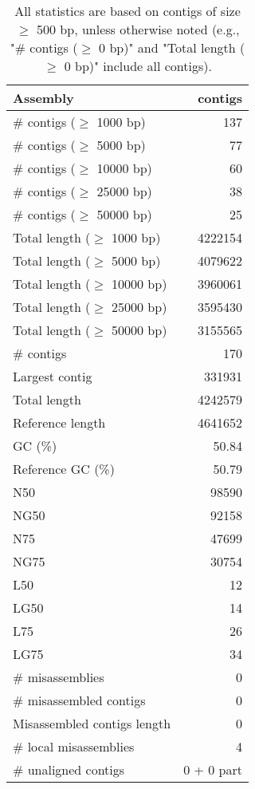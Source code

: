 \documentclass[12pt,a4paper]{article}
\begin{document}
\begin{table}[ht]
\begin{center}
\caption{All statistics are based on contigs of size $\geq$ 500 bp, unless otherwise noted (e.g., "\# contigs ($\geq$ 0 bp)" and "Total length ($\geq$ 0 bp)" include all contigs).}
\begin{tabular}{|l*{1}{|r}|}
\hline
Assembly & contigs \\ \hline
\# contigs ($\geq$ 1000 bp) & 137 \\ \hline
\# contigs ($\geq$ 5000 bp) & 77 \\ \hline
\# contigs ($\geq$ 10000 bp) & 60 \\ \hline
\# contigs ($\geq$ 25000 bp) & 38 \\ \hline
\# contigs ($\geq$ 50000 bp) & 25 \\ \hline
Total length ($\geq$ 1000 bp) & 4222154 \\ \hline
Total length ($\geq$ 5000 bp) & 4079622 \\ \hline
Total length ($\geq$ 10000 bp) & 3960061 \\ \hline
Total length ($\geq$ 25000 bp) & 3595430 \\ \hline
Total length ($\geq$ 50000 bp) & 3155565 \\ \hline
\# contigs & 170 \\ \hline
Largest contig & 331931 \\ \hline
Total length & 4242579 \\ \hline
Reference length & 4641652 \\ \hline
GC (\%) & 50.84 \\ \hline
Reference GC (\%) & 50.79 \\ \hline
N50 & 98590 \\ \hline
NG50 & 92158 \\ \hline
N75 & 47699 \\ \hline
NG75 & 30754 \\ \hline
L50 & 12 \\ \hline
LG50 & 14 \\ \hline
L75 & 26 \\ \hline
LG75 & 34 \\ \hline
\# misassemblies & 0 \\ \hline
\# misassembled contigs & 0 \\ \hline
Misassembled contigs length & 0 \\ \hline
\# local misassemblies & 4 \\ \hline
\# unaligned contigs & 0 + 0 part \\ \hline

\end{tabular}
\end{center}
\end{table}
\end{document}
